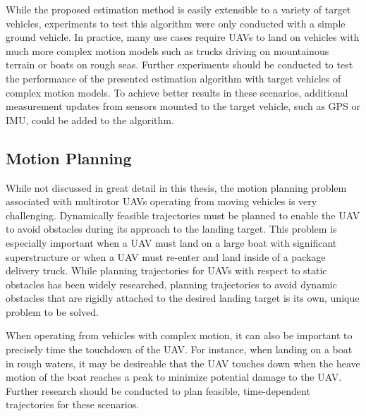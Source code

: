 While the proposed estimation method is easily extensible to a variety of
target vehicles, experiments to test this algorithm were only conducted
with a simple ground vehicle.
In practice, many use cases require UAVs to land on
vehicles with much more complex motion models such as trucks driving on
mountainous terrain or boats on rough seas.
Further experiments should be conducted to test the performance of the presented
estimation algorithm with target vehicles of complex motion models.
To achieve better results in these scenarios, additional measurement updates
from sensors mounted to the target vehicle, such as GPS or IMU,
could be added  to the algorithm.

\subsection{Motion Planning}
\label{sec:future_motion_planning}
While not discussed in great detail in this thesis, the motion planning problem
associated with multirotor UAVs operating from moving vehicles is very
challenging.
Dynamically feasible trajectories must be planned to enable the UAV to avoid
obstacles during its approach to the landing target.
This problem is especially important when a UAV must land on a large boat
with significant superstructure or when a UAV must re-enter and land inside of a
package delivery truck. While planning trajectories for UAVs with respect to
static obstacles has been widely researched, planning trajectories to avoid
dynamic obstacles that are rigidly attached to the desired landing target is its
own, unique problem to be solved.

When operating from vehicles with complex motion, 
it can also be important to precisely time the touchdown of the UAV.
For instance, when landing on a boat in rough
waters, it may be desireable that the UAV touches down when the heave motion of the
boat reaches a peak to minimize potential damage to the UAV.
Further research should be conducted to plan feasible, time-dependent
trajectories for these scenarios.

